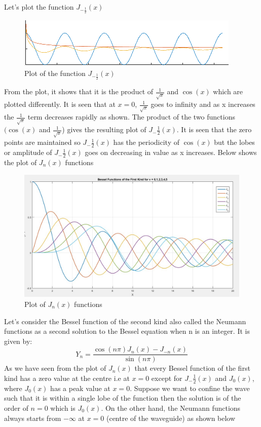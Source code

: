 Let's plot the function $ J_{-\frac{1}{2}}(x)$
\begin{figure}[h]
\centering
\includegraphics[width=1\linewidth]{"./graphics/fig 11_1"}
\caption{ Plot of the function $ J_{-\frac{1}{2}}(x)$}
\label{fig:fig-1}
\end{figure}
From the plot, it shows that it is the product of $\frac{1}{\sqrt{x}}$ and $\cos(x)$ which are plotted differently. It is seen that at $x=0$, $\frac{1}{\sqrt{x}}$ goes to infinity and as x increases the $\frac{1}{\sqrt{x}}$ term decreases rapidly as shown. The product of the two functions $(\cos(x)$ and $\frac{1}{\sqrt{x}}$) gives the resulting plot of $J_-{\frac{1}{2}}(x)$. It is seen that the zero points are maintained so $J_-{\frac{1}{2}}(x)$ has the periodicity of $\cos(x)$ but the lobes or amplitude of $J_-{\frac{1}{2}}(x)$ goes on decreasing in value as x increases. Below shows the plot of $J_n(x)$ functions
\begin{figure}[h]
\centering
\includegraphics[width=1\linewidth]{"./graphics/fig 11_2"}
\caption{ Plot of $J_n(x)$ functions}
\label{fig:fig-2}
\end{figure}
Let's consider the Bessel function of the second kind also called the Neumann functions as a second solution to the Bessel equation when n is an integer. It is given by: 
$$Y_n = \frac{\cos(n\pi) J_n(x) - J_{-n}(x)}{\sin(n\pi)}$$
As we have seen from the plot of $J_n(x)$ that every Bessel function of the first kind has a zero value at the centre i.e at $x= 0$ except for $J_-{\frac{1}{2}}(x)$ and $J_0(x)$, where $J_0(x)$ has a peak value at $ x= 0$. Suppose we want to confine the wave such that it is within a single lobe of the function then the solution is of the order of $n =0$ which is $J_0(x)$. On the other hand, the Neumann functions always starts from $-\infty$ at $x=0$ (centre of the waveguide) as shown below

